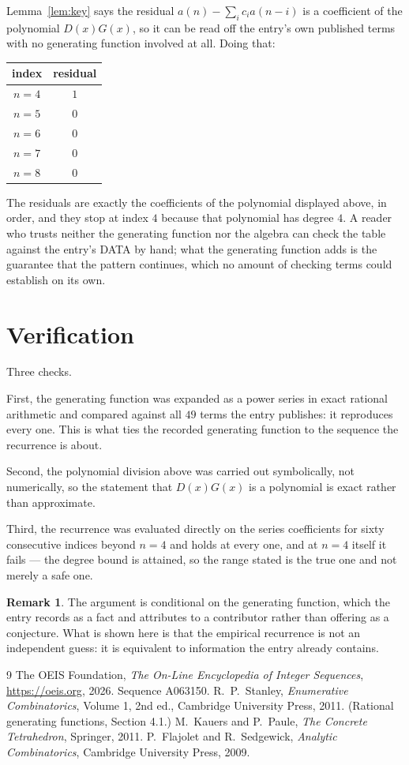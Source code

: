 \documentclass[11pt,a4paper]{article}
\theoremstyle{plain}
\theoremstyle{definition}
\newtheorem{remark}[theorem]{Remark}
\begin{document}
Lemma~\ref{lem:key} says the residual $a(n)-\sum_ic_ia(n-i)$ is a coefficient of the
polynomial $D(x)G(x)$, so it can be read off the entry's own published terms with no
generating function involved at all. Doing that:
\begin{center}
\begin{tabular}{cc}
index & residual \\ \hline
$n=4$ & $1$ \\
$n=5$ & $0$ \\
$n=6$ & $0$ \\
$n=7$ & $0$ \\
$n=8$ & $0$
\end{tabular}
\end{center}
The residuals are exactly the coefficients of the polynomial displayed above, in order, and
they stop at index $4$ because that polynomial has degree $4$. A reader who trusts
neither the generating function nor the algebra can check the table against the entry's DATA
by hand; what the generating function adds is the guarantee that the pattern continues, which
no amount of checking terms could establish on its own.

\section{Verification}

Three checks.

First, the generating function was expanded as a power series in exact rational arithmetic and
compared against all $49$ terms the entry publishes: it reproduces every one. This is
what ties the recorded generating function to the sequence the recurrence is about.

Second, the polynomial division above was carried out symbolically, not numerically, so the
statement that $D(x)G(x)$ is a polynomial is exact rather than approximate.

Third, the recurrence was evaluated directly on the series coefficients for sixty consecutive
indices beyond $n=4$ and holds at every one, and at $n=4$ itself it fails --- the
degree bound is attained, so the range stated is the true one and not merely a safe one.

\begin{remark}
The argument is conditional on the generating function, which the entry records as a fact and
attributes to a contributor rather than offering as a conjecture. What is shown here is that
the empirical recurrence is not an independent guess: it is equivalent to information the
entry already contains.
\end{remark}

\begin{thebibliography}{9}
 The OEIS Foundation, \emph{The On-Line Encyclopedia of Integer
Sequences}, \url{https://oeis.org}, 2026. Sequence A063150.
 R.~P.~Stanley, \emph{Enumerative Combinatorics}, Volume 1, 2nd ed.,
Cambridge University Press, 2011. (Rational generating functions, Section 4.1.)
 M.~Kauers and P.~Paule, \emph{The Concrete Tetrahedron}, Springer, 2011.
 P.~Flajolet and R.~Sedgewick, \emph{Analytic Combinatorics}, Cambridge
University Press, 2009.
\end{thebibliography}
\end{document}
